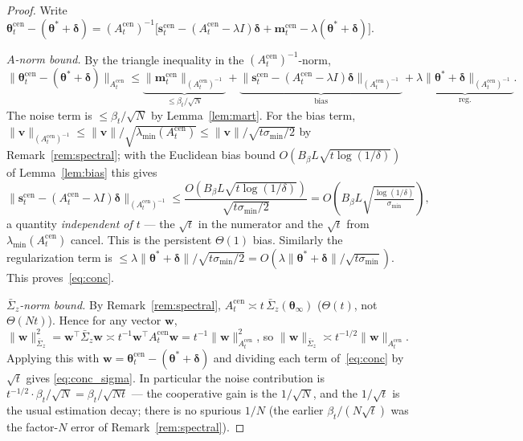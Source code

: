 \documentclass[11pt]{article}
\begin{document}
\begin{proof}
Write
$\bm{\theta}_t^{\mathrm{cen}}-(\bm{\theta}^{\!*}+\bm{\delta})
=(A_t^{\mathrm{cen}})^{-1}\bigl[\bm{s}_t^{\mathrm{cen}}
-(A_t^{\mathrm{cen}}-\lambda I)\bm{\delta}
+\bm{m}_t^{\mathrm{cen}}-\lambda(\bm{\theta}^{\!*}+\bm{\delta})\bigr]$.

\emph{$A$-norm bound.}  By the triangle inequality in the
$(A_t^{\mathrm{cen}})^{-1}$-norm,
\[
\|\bm{\theta}_t^{\mathrm{cen}}-(\bm{\theta}^{\!*}+\bm{\delta})\|_{A_t^{\mathrm{cen}}}
\leq\underbrace{\|\bm{m}_t^{\mathrm{cen}}\|_{(A_t^{\mathrm{cen}})^{-1}}}_{\leq\beta_t/\sqrt N}
+\underbrace{\|\bm{s}_t^{\mathrm{cen}}-(A_t^{\mathrm{cen}}-\lambda I)\bm{\delta}\|_{(A_t^{\mathrm{cen}})^{-1}}}_{\text{bias}}
+\underbrace{\lambda\|\bm{\theta}^{\!*}+\bm{\delta}\|_{(A_t^{\mathrm{cen}})^{-1}}}_{\text{reg.}}.
\]
The noise term is $\leq\beta_t/\sqrt N$ by Lemma~\ref{lem:mart}.
For the bias term, $\|\bm{v}\|_{(A_t^{\mathrm{cen}})^{-1}}\leq
\|\bm{v}\|/\sqrt{\lambda_{\min}(A_t^{\mathrm{cen}})}\leq\|\bm{v}\|/\sqrt{t\sigma_{\min}/2}$
by Remark~\ref{rem:spectral}; with the Euclidean bias bound
$O(B_\beta L\sqrt{t\log(1/\delta)})$ of Lemma~\ref{lem:bias} this gives
\[
\|\bm{s}_t^{\mathrm{cen}}-(A_t^{\mathrm{cen}}-\lambda I)\bm{\delta}\|_{(A_t^{\mathrm{cen}})^{-1}}
\leq\frac{O(B_\beta L\sqrt{t\log(1/\delta)})}{\sqrt{t\sigma_{\min}/2}}
=O\!\left(B_\beta L\sqrt{\tfrac{\log(1/\delta)}{\sigma_{\min}}}\right),
\]
a quantity \emph{independent of $t$} --- the $\sqrt t$ in the
numerator and the $\sqrt t$ from $\lambda_{\min}(A_t^{\mathrm{cen}})$
cancel.  This is the persistent $\Theta(1)$ bias.
Similarly the regularization term is
$\leq\lambda\|\bm{\theta}^{\!*}+\bm{\delta}\|/\sqrt{t\sigma_{\min}/2}
=O(\lambda\|\bm{\theta}^{\!*}+\bm{\delta}\|/\sqrt{t\sigma_{\min}})$.
This proves~\eqref{eq:conc}.

\emph{$\bar{\Sigma}_z$-norm bound.}  By Remark~\ref{rem:spectral},
$A_t^{\mathrm{cen}}\asymp t\,\bar{\Sigma}_z(\bm{\theta}_\infty)$
($\Theta(t)$, not $\Theta(Nt)$).  Hence for any vector $\bm{w}$,
$\|\bm{w}\|_{\bar{\Sigma}_z}^2=\bm{w}^\top\bar{\Sigma}_z\bm{w}
\asymp t^{-1}\bm{w}^\top A_t^{\mathrm{cen}}\bm{w}
=t^{-1}\|\bm{w}\|_{A_t^{\mathrm{cen}}}^2$,
so $\|\bm{w}\|_{\bar{\Sigma}_z}\asymp t^{-1/2}\|\bm{w}\|_{A_t^{\mathrm{cen}}}$.
Applying this with
$\bm{w}=\bm{\theta}_t^{\mathrm{cen}}-(\bm{\theta}^{\!*}+\bm{\delta})$
and dividing each term of~\eqref{eq:conc} by $\sqrt t$ gives
\eqref{eq:conc_sigma}.  In particular the noise contribution is
$t^{-1/2}\cdot\beta_t/\sqrt N=\beta_t/\sqrt{Nt}$ --- the cooperative
gain is the $1/\sqrt N$, and the $1/\sqrt t$ is the usual estimation
decay; there is no spurious $1/N$ (the earlier
$\beta_t/(N\sqrt t)$ was the factor-$N$ error of
Remark~\ref{rem:spectral}).
\end{proof}
\end{document}
